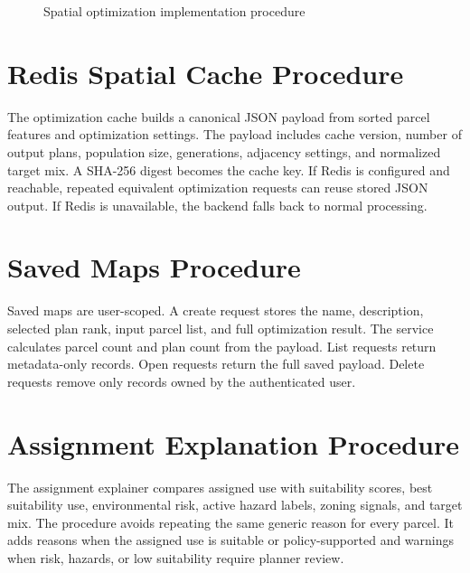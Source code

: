 \documentclass[12pt,a4paper,oneside]{report}
\begin{document}
\begin{figure}[H]\centering
{}
\caption{Spatial optimization implementation procedure}
\end{figure}

\section{Redis Spatial Cache Procedure}
The optimization cache builds a canonical JSON payload from sorted parcel features and optimization settings. The payload includes cache version, number of output plans, population size, generations, adjacency settings, and normalized target mix. A SHA-256 digest becomes the cache key. If Redis is configured and reachable, repeated equivalent optimization requests can reuse stored JSON output. If Redis is unavailable, the backend falls back to normal processing.

\section{Saved Maps Procedure}
Saved maps are user-scoped. A create request stores the name, description, selected plan rank, input parcel list, and full optimization result. The service calculates parcel count and plan count from the payload. List requests return metadata-only records. Open requests return the full saved payload. Delete requests remove only records owned by the authenticated user.

\section{Assignment Explanation Procedure}
The assignment explainer compares assigned use with suitability scores, best suitability use, environmental risk, active hazard labels, zoning signals, and target mix. The procedure avoids repeating the same generic reason for every parcel. It adds reasons when the assigned use is suitable or policy-supported and warnings when risk, hazards, or low suitability require planner review.
\end{document}
